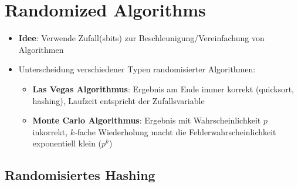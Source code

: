 \documentclass[10pt,a4paper]{article}
\begin{document}
	\newpage
	\section{Randomized Algorithms}
	\label{ra:sec:randomized_algorithms}
	
	\begin{itemize}
		\item \textbf{Idee}: Verwende Zufall(sbits) zur Beschleunigung/Vereinfachung von Algorithmen
		\item Unterscheidung verschiedener Typen randomisierter Algorithmen:
		\begin{itemize}
			\item \textbf{Las Vegas Algorithmus}: Ergebnis am Ende immer korrekt (quicksort, hashing), Laufzeit entspricht der Zufallsvariable
			\item \textbf{Monte Carlo Algorithmus}: Ergebnis mit Wahrscheinlichkeit $p$ inkorrekt, $k$-fache Wiederholung macht die Fehlerwahrscheinlichkeit exponentiell klein ($p^k$)
		\end{itemize}
	\end{itemize}

	\subsection{Randomisiertes Hashing}
	\label{ra:sub:randomisiertes_hashing}
	
\end{document}
